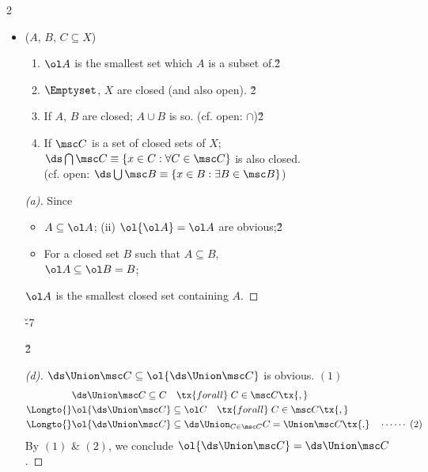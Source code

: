 \documentclass[dvipdfmx,a4paper,titlepage,9pt]{jsarticle}
\begin{document}
\begin{multicols*}{2}
\begin{itemize}[label=-]
\begin{itemize}[label={\Cdot}]
\item{} ($A$, $B$, $C\subseteq X$)
\begin{enumerate}[label=(\alph*)]
\item $\ol A$ is the smallest set which $A$ is a subset of.\v2
\item $\Emptyset$, $X$ are closed (and also open). \v2
\item If $A$, $B$ are closed; $A\cup B$ is so. {\Gray(cf. open: $\cap$)}\v2
\item If $\msc C$ is a set of closed sets of $X$; \\
      $\ds\bigcap\msc C\equiv\{x\in C:\forall C\in \msc C\}$ is also closed. \\
      {\Gray (cf. open: $\ds\bigcup\msc B\equiv\{x\in B:\exists B\in\msc B\}$)}
\end{enumerate}

\begin{pfbox}
\begin{proof}[(a)] Since
\begin{itemize}
\setlength{\leftskip}{-5pt}
\item[(i)] $A\subseteq \ol A$; (ii) $\ol{\ol A}=\ol A$ are obvious;\v2
\item[(ii)] For a closed set $B$ such that $A\subseteq B$,\\
            $\ol A\subseteq \ol B=B$;
\end{itemize}
$\ol A$ is the smallest closed set containing $A$.
\end{proof}\v{-7}

\dotfill\v2

\begin{proof}[(d)]
$\ds\Union\msc C\subseteq\ol{\ds\Union\msc C}$ is obvious. \hfill $(1)$
$$\begin{aligned}
           &\ds\Union\msc C\subseteq C\quad\tx{for all}\; C\in\msc C\tx{,} \\
  \Longto{}&\ol{\ds\Union\msc C}\subseteq \ol C\quad\tx{for all}\; C\in\msc C\tx{,}\\
  \Longto{}&\ol{\ds\Union\msc C}\subseteq\ds\Union_{C\in\msc C} C=\Union\msc C\tx{.}\quad\cdots\cdots\;(2)
  \end{aligned}$$
By $(1)$ \& $(2)$, we conclude $\ol{\ds\Union\msc C}=\ds\Union\msc C$.
\end{proof}
\end{pfbox}


\end{itemize}
\end{itemize}
\end{multicols*}
\end{document}
